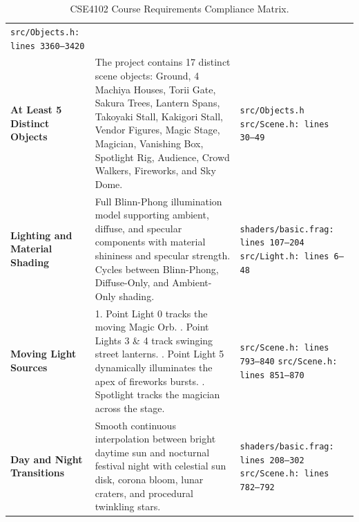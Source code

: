 \begin{table}[htbp]
\begin{tabularx}{\textwidth}{p{4.0cm} p{7.0cm} p{4.2cm}}
\texttt{src/Objects.h: lines 3360--3420} \\
\addlinespace
\textbf{At Least 5 Distinct Objects} &
The project contains 17 distinct scene objects: Ground, 4 Machiya Houses, Torii Gate, Sakura Trees, Lantern Spans, Takoyaki Stall, Kakigori Stall, Vendor Figures, Magic Stage, Magician, Vanishing Box, Spotlight Rig, Audience, Crowd Walkers, Fireworks, and Sky Dome. &
\texttt{src/Objects.h} \newline
\texttt{src/Scene.h: lines 30--49} \\
\addlinespace
\textbf{Lighting and Material Shading} &
Full Blinn-Phong illumination model supporting ambient, diffuse, and specular components with material shininess and specular strength. Cycles between Blinn-Phong, Diffuse-Only, and Ambient-Only shading. &
\texttt{shaders/basic.frag: lines 107--204} \newline
\texttt{src/Light.h: lines 6--48} \\
\addlinespace
\textbf{Moving Light Sources} &
1. Point Light 0 tracks the moving Magic Orb. \newline
2. Point Lights 3 \& 4 track swinging street lanterns. \newline
3. Point Light 5 dynamically illuminates the apex of fireworks bursts. \newline
4. Spotlight tracks the magician across the stage. &
\texttt{src/Scene.h: lines 793--840} \newline
\texttt{src/Scene.h: lines 851--870} \\
\addlinespace
\textbf{Day and Night Transitions} &
Smooth continuous interpolation between bright daytime sun and nocturnal festival night with celestial sun disk, corona bloom, lunar craters, and procedural twinkling stars. &
\texttt{shaders/basic.frag: lines 208--302} \newline
\texttt{src/Scene.h: lines 782--792} \\
\bottomrule
\end{tabularx}
\caption{CSE4102 Course Requirements Compliance Matrix.}
\label{tab:course_compliance}
\end{table}

